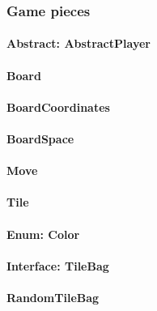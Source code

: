 \documentclass[12pt, letterpaper]{article}
\begin{document}


    \subsubsection{Game pieces}


    \paragraph{Abstract: AbstractPlayer}

    \paragraph{Board}

    \paragraph{BoardCoordinates}

    \paragraph{BoardSpace}

    \paragraph{Move}


    \paragraph{Tile}

    \paragraph{Enum: Color}

    \paragraph{Interface: TileBag}

    \paragraph{RandomTileBag}
\end{document}
